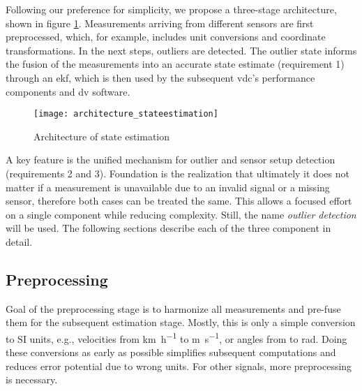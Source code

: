 Following our preference for simplicity, we propose a three-stage architecture, shown in figure \ref{fig:architecture-stateestimation}. Measurements arriving from different sensors are first preprocessed, which, for example, includes unit conversions and coordinate transformations. In the next steps, outliers are detected. The outlier state informs the fusion of the measurements into an accurate state estimate (requirement 1) through an \gls{ekf}, which is then used by the subsequent \gls{vdc}'s performance components and \gls{dv} software.

\begin{figure}
	\centering
	\texttt{[image: architecture\_stateestimation]}%
	\caption{Architecture of state estimation}
	\label{fig:architecture-stateestimation}
\end{figure}

A key feature is the unified mechanism for outlier and sensor setup detection (requirements 2 and 3). Foundation is the realization that ultimately it does not matter if a measurement is unavailable due to an invalid signal or a missing sensor, therefore both cases can be treated the same. This allows a focused effort on a single component while reducing complexity. Still, the name \textit{outlier detection} will be used. The following sections describe each of the three component in detail.


\subsection{Preprocessing}
Goal of the preprocessing stage is to harmonize all measurements and pre-fuse them for the subsequent estimation stage. Mostly, this is only a simple conversion to SI units, e.g., velocities from \si{\kilo\meter\per\hour} to \si{\meter\per\second}, or angles from \si{\deg} to \si{\radian}. Doing these conversions as early as possible simplifies subsequent computations and reduces error potential due to wrong units. For other signals, more preprocessing is necessary.

